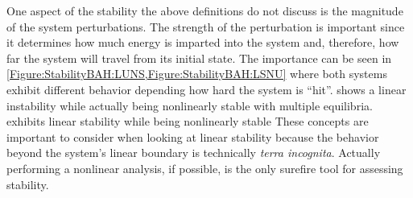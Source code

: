 One aspect of the stability the above definitions do not discuss is the magnitude of the system perturbations.
The strength of the perturbation is important since it determines how much energy is imparted into the system and, therefore, how far the system will travel from its initial state.
The importance can be seen in \cref{Figure:StabilityBAH:LUNS,Figure:StabilityBAH:LSNU} where both systems exhibit different behavior depending how hard the system is ``hit''.
 shows a linear instability while actually being nonlinearly stable with multiple equilibria.
 exhibits linear stability while being nonlinearly stable
These concepts are important to consider when looking at linear stability because the behavior beyond the system's linear boundary is technically \textit{terra incognita}.
Actually performing a nonlinear analysis, if possible, is the only surefire tool for assessing stability.

